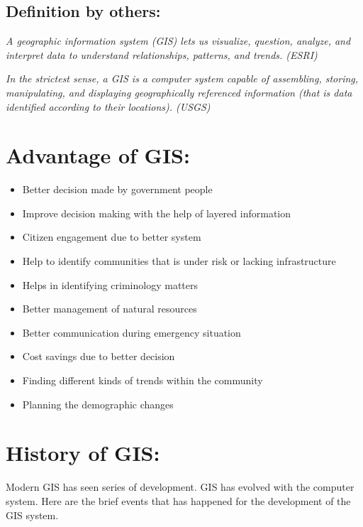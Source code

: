 \documentclass[12pt, letter]{article}
\begin{document}
\subsection {Definition by others:}

\textit{A geographic information system (GIS) lets us visualize, question, analyze, and interpret data to understand relationships, patterns, and trends. (ESRI)}

\medskip

\textit{In the strictest sense, a GIS is a computer system capable of assembling, storing, manipulating, and displaying geographically referenced information (that is data identified according to their locations). (USGS)}

\section {Advantage of GIS:}

\begin{itemize}

 \item Better decision made by government people
 \item Improve decision making with the help of layered information
 \item Citizen engagement due to better system
 \item Help to identify communities that is under risk or lacking infrastructure
 \item Helps in identifying criminology matters
 \item Better management of natural resources
 \item Better communication during emergency situation
 \item Cost savings due to better decision
 \item Finding different kinds of trends within the community
 \item Planning the demographic changes

\end{itemize}

\section{History of GIS:}

Modern GIS has seen series of development. GIS has evolved with the computer system. Here are the brief events that has happened for the development of the GIS system.

\medskip
\end{document}
